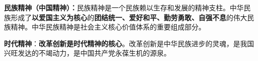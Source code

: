 {\textbf{{民族精神}{（中国精神）}：}民族精神是一个民族赖以生存和发展的精神支柱。中华民族形成了\textbf{{以爱国主义为核心}}的{\textbf{团结统一、爱好和平、勤劳勇敢、自强不息}}的伟大民族精神。中华民族精神是社会主义核心价值体系的重要组成部分。}

{\textbf{{时代精神}}{：}\textbf{{改革创新是时代精神的核心}}{。改革创新是中华民族进步的灵魂，是我国兴旺发达的不竭动力，是中国共产党永葆生机的源泉。}}
